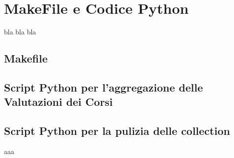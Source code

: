 \begin{appendices}
\label{appendix}
\chapter{MakeFile e Codice Python}
bla bla bla

    \section{Makefile}
    \label{appendix:makefile}
	    

    \section{Script Python per l'aggregazione delle Valutazioni dei Corsi}
    \label{appendix:teval}

     \section{Script Python per la pulizia delle collection}
    \label{appendix:clean}

    aaa

\end{appendices}
